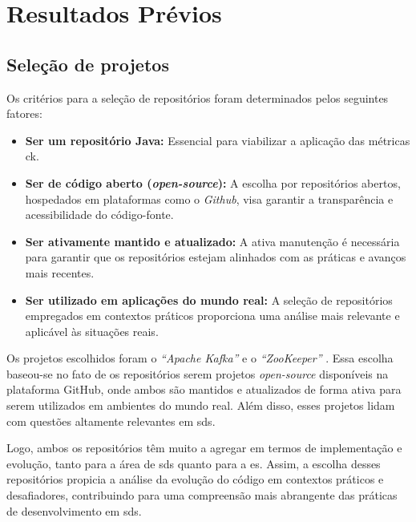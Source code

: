 
\chapter{Resultados Prévios}
\label{cap:resultados}

\section{Seleção de projetos}

Os critérios para a seleção de repositórios foram determinados pelos seguintes fatores:

\begin{itemize}
    \item \textbf{Ser um repositório Java:} Essencial para viabilizar a aplicação das métricas \gls{ck}.
    \item \textbf{Ser de código aberto (\textit{open-source}):} A escolha por repositórios abertos, hospedados em plataformas como o \textit{Github}, visa garantir a transparência e acessibilidade do código-fonte.
    \item \textbf{Ser ativamente mantido e atualizado:} A ativa manutenção é necessária para garantir que os repositórios estejam alinhados com as práticas e avanços mais recentes.
    \item \textbf{Ser utilizado em aplicações do mundo real:} A seleção de repositórios empregados em contextos práticos proporciona uma análise mais relevante e aplicável às situações reais.
\end{itemize}

Os projetos escolhidos foram o \textit{``Apache Kafka''} \cite{KafkaGitHub} e o \textit{``ZooKeeper''} \cite{ZookeeperGitHub}. Essa escolha baseou-se no fato de os repositórios serem projetos \textit{open-source} disponíveis na plataforma GitHub, onde ambos são mantidos e atualizados de forma ativa para serem utilizados em ambientes do mundo real. Além disso, esses projetos lidam com questões altamente relevantes em \gls{sds}.

Logo, ambos os repositórios têm muito a agregar em termos de implementação e evolução, tanto para a área de \gls{sds} quanto para a \gls{es}. Assim, a escolha desses repositórios propicia a análise da evolução do código em contextos práticos e desafiadores, contribuindo para uma compreensão mais abrangente das práticas de desenvolvimento em \gls{sds}.

